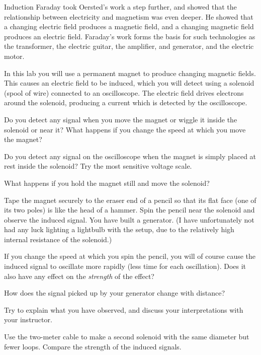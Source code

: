 \begin{lab}{Induction}
Faraday took Oersted's work a step further, and showed that
the relationship between electricity and magnetism was even
deeper. He showed that a changing electric field produces a
magnetic field, and a changing magnetic field produces an
electric field. Faraday's work forms the basis for such
technologies as the transformer, the electric guitar, the
amplifier, and generator, and the electric motor.


In this lab you will use a permanent magnet to produce
changing magnetic fields. This causes an electric field to
be induced, which you will detect using a solenoid (spool of
wire) connected to an oscilloscope. The electric field
drives electrons around the solenoid, producing a current
which is detected by the oscilloscope.


Do you detect any signal when you move the magnet or wiggle
it inside the solenoid or near it? What happens if you
change the speed at which you move the magnet?


Do you detect any signal on the oscilloscope when the magnet
is simply placed at rest inside the solenoid? Try the most
sensitive voltage scale.


What happens if you hold the magnet still and move the solenoid? 


Tape the magnet securely to the eraser end of a pencil so
that its flat face (one of its two poles) is like the head
of a hammer.
Spin the pencil near the
solenoid and observe the induced signal. You have built a
generator. (I have unfortunately not had any luck lighting a
lightbulb with the setup, due to the relatively high
internal resistance of the solenoid.)




If you change the speed at which you spin the pencil, you
will of course cause the induced signal to oscillate more rapidly
(less time for each oscillation).
Does it also have any effect on the
\emph{strength} of the effect?


How does the signal picked up by your generator change with distance?

Try to explain what you have observed, and discuss your
interpretations with your instructor.


Use the two-meter cable to make a second solenoid with the
same diameter but fewer loops. Compare the strength of the
induced signals.

\end{lab}


